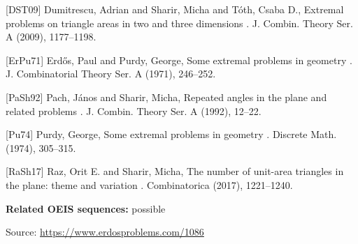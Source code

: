 \documentclass{article}
\begin{document}
[DST09] Dumitrescu, Adrian and Sharir, Micha and T\'oth, Csaba D., Extremal problems on triangle areas in two and three dimensions . J. Combin. Theory Ser. A (2009), 1177--1198.

[ErPu71] Erd\H{o}s, Paul and Purdy, George, Some extremal problems in geometry . J. Combinatorial Theory Ser. A (1971), 246--252.

[PaSh92] Pach, J\'{a}nos and Sharir, Micha, Repeated angles in the plane and related problems . J. Combin. Theory Ser. A (1992), 12--22.

[Pu74] Purdy, George, Some extremal problems in geometry . Discrete Math. (1974), 305--315.

[RaSh17] Raz, Orit E. and Sharir, Micha, The number of unit-area triangles in the plane: theme and variation . Combinatorica (2017), 1221--1240.

\noindent\textbf{Related OEIS sequences:} possible


\bigskip
\noindent\small{Source: \url{https://www.erdosproblems.com/1086}}
\end{document}
